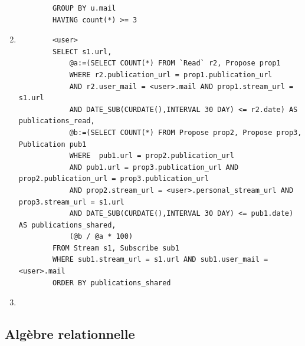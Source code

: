 \documentclass[a4paper,10pt]{article}
\begin{document}
\begin{enumerate}
\begin{verbatim}
		GROUP BY u.mail
		HAVING count(*) >= 3
             \end{verbatim}
	    \item 
	    \begin{verbatim}
		<user>
		SELECT s1.url, 
		    @a:=(SELECT COUNT(*) FROM `Read` r2, Propose prop1 
		    WHERE r2.publication_url = prop1.publication_url 
		    AND r2.user_mail = <user>.mail AND prop1.stream_url = s1.url 
		    AND DATE_SUB(CURDATE(),INTERVAL 30 DAY) <= r2.date) AS publications_read,
		    @b:=(SELECT COUNT(*) FROM Propose prop2, Propose prop3, Publication pub1 
		    WHERE  pub1.url = prop2.publication_url 
		    AND pub1.url = prop3.publication_url AND prop2.publication_url = prop3.publication_url 
		    AND prop2.stream_url = <user>.personal_stream_url AND prop3.stream_url = s1.url 
		    AND DATE_SUB(CURDATE(),INTERVAL 30 DAY) <= pub1.date) AS publications_shared,
		    (@b / @a * 100)
		FROM Stream s1, Subscribe sub1
		WHERE sub1.stream_url = s1.url AND sub1.user_mail = <user>.mail
		ORDER BY publications_shared
             \end{verbatim}
	    \item 
	\end{enumerate}

\subsection{Algèbre relationnelle}

\end{document}
